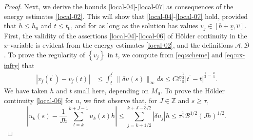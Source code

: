 \documentclass[10pt,a4paper]{amsart}
\begin{document}
\begin{proof}
Next, we derive the bounds \eqref{local-04}-\eqref{local-07} as consequences of the energy estimates \eqref{local-02}. This will show that \eqref{local-04}-\eqref{local-07} hold, provided that \(h\leq h_{0}\) and \(t\leq t_0\), and for as long as the solution has values \(v_{j} \in [b+\underline{v}, \hat{v}]\). 
First, the validity of the assertions \eqref{local-04}-\eqref{local-06} of H\"{o}lder continuity in the \(x\)-variable is evident from the energy estimates \eqref{local-02}, and the definitions \(\mathscr{A},\mathscr{B}\). To prove the regularity of \(\left\{{v}_{j}\right\}\) in \(t\), we compute from \eqref{eq:scheme} and \eqref{eq:ux-infty} that
\begin{equation}\label{eq256}
	\begin{aligned}
\left| {{v}_{j}\left( {t}^{\prime }\right)  - {v}_{j}(t) }\right|  &\leq  \int_{t}^{{t}^{\prime }}\parallel {\delta u}\left( s\right) {\parallel }_{\infty }{ds}
\leq  C \mathscr{C}_{0}^{\frac{1}{2}}{\big| {t}^{\prime } - t\big| }^{\frac{1}{2} - \frac{\theta }{4}}.
	\end{aligned}	
\end{equation}
We have taken \(h\) and \(t\) small here, depending on \({M}_{0}\).
To prove the H\"{o}lder continuity \eqref{local-06} for $u$, we first observe that, for \(J \in  \mathbb{Z}\) and \(s \geq  \tau\),
\[
\left| {u_k(s)  - \frac{1}{Jh}\mathop{\sum }\limits_{{l = k}}^{{k + J - 1}}{u}_{k}\left( s\right) h}\right|  \leq  \mathop{\sum }\limits_{{j = k + 1/2}}^{{k + J - 3/2}}\left| {\delta {u}_{j}}\right| h \leq  \tau^{\frac14}\mathscr{B}^{1/2}(Jh)^{1/2}.
\]
\end{proof}
\end{document}
